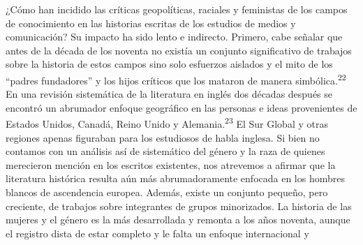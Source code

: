 \documentclass{tufte-handout}
\begin{document}
¿Cómo han incidido las críticas geopolíticas, raciales y feministas de
los campos de conocimiento en las historias escritas de los estudios de
medios y comunicación? Su impacto ha sido lento e indirecto. Primero,
cabe señalar que antes de la década de los noventa no existía un
conjunto significativo de trabajos sobre la historia de estos campos
sino solo esfuerzos aislados y el mito de los ``padres fundadores'' y
los hijos críticos que los mataron de manera simbólica.\textsuperscript{22} En una revisión sistemática de la literatura en
inglés dos décadas después se encontró un abrumador enfoque geográfico
en las personas e ideas provenientes de Estados Unidos, Canadá, Reino
Unido y Alemania.\textsuperscript{23}
El Sur Global y otras regiones apenas figuraban para los estudiosos de
habla inglesa. Si bien no contamos con un análisis así de sistemático
del género y la raza de quienes merecieron mención en los escritos
existentes, nos atrevemos a afirmar que la literatura histórica resulta
aún más abrumadoramente enfocada en los hombres blancos de ascendencia
europea. Además, existe un conjunto pequeño, pero creciente, de trabajos
sobre integrantes de grupos minorizados. La historia de las mujeres y el
género es la más desarrollada y remonta a los años noventa, aunque el
registro dista de estar completo y le falta un enfoque internacional y
\end{document}
